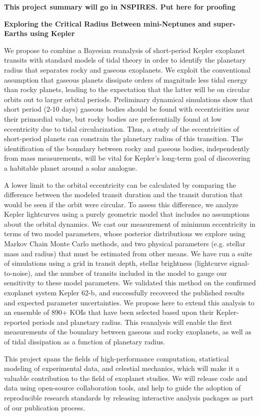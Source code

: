\centerline{\bf This project summary will go in NSPIRES.  Put here for proofing} \medskip

\centerline{\bf Exploring the Critical Radius Between mini-Neptunes and super-Earths using Kepler} \medskip

We propose to combine a Bayesian reanalysis of short-period Kepler exoplanet transits with standard models of tidal theory in order to identify the planetary radius that separates rocky and gaseous exoplanets. We exploit the conventional assumption that gaseous planets dissipate orders of magnitude less tidal energy than rocky planets, leading to the expectation that the latter will be on circular orbits out to larger orbital periods. Preliminary dynamical simulations show that short period (2-10 days) gaseous bodies should be found with eccentricities near their primordial value, but rocky bodies are preferentially found at low eccentricity due to tidal circularization.  Thus, a study of the eccentricities of short-period planets can constrain the planetary radius of this transition.  The identification of the boundary between rocky and gaseous bodies, independently from mass measurements, will be vital for Kepler's long-term goal of discovering a habitable planet around a solar analogue.

A lower limit to the orbital eccentricity can be calculated by comparing the difference between the modeled transit duration and the transit duration that would be seen if the orbit were circular.  To assess this difference, we analyze Kepler lightcurves using a purely geometric model that includes no assumptions about the orbital dynamics.  We cast our measurement of minimum eccentricity in terms of two model parameters, whose posterior distributions we explore using Markov Chain Monte Carlo methods, and two physical parameters (e.g. stellar mass and radius) that must be estimated from other means.  We have run a suite of simulations using a grid in transit depth, stellar brightness (lightcurve signal-to-noise), and the number of transits included in the model to gauge our sensitivity to these model parameters.  We validated this method on the confirmed exoplanet system Kepler 62-b, and successfully recovered the published results and expected parameter uncertainties. We propose here to extend this analysis to an ensemble of 890+ KOIs that have been selected based upon their Kepler-reported periods and planetary radius.  This reanalysis will enable the first measurements of the boundary between gaseous and rocky exoplanets, as well as of tidal dissipation as a function of planetary radius.

This project spans the fields of high-performance computation, statistical modeling of experimental data, and celestial mechanics, which will make it a valuable contribution to the field of exoplanet studies.  We will release code and data using open-source collaboration tools, and help to guide the adoption of reproducible research standards by releasing interactive analysis packages as part of our publication process.

